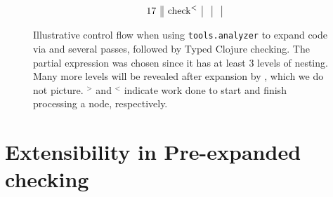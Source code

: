 \begin{figure}
$$\begin{array}{r||l|l|l|}
     17         & \text{\clj{check}}^{<}      &                             &                      \\
  \end{array}
$$
  \caption{Illustrative control flow when
  using \texttt{tools.analyzer} to expand code via  and several passes,
  followed by Typed Clojure checking.
  The partial expression 
  was chosen since it has at least 3 levels of nesting.
  Many more levels will be revealed after expansion by , which we do not picture.
  ${}^>$ and ${}^<$ indicate work done to start and finish processing a node, respectively.
  }
  \label{fig:analyzer:control-flow-pre-expand}
\end{figure}

\chapter{Extensibility in Pre-expanded checking}


